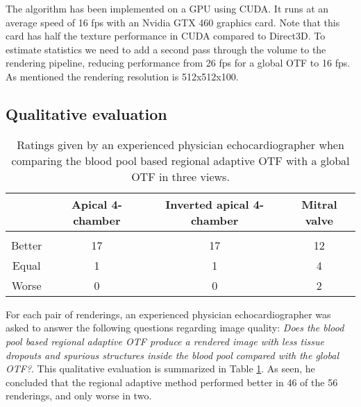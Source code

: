 The algorithm has been implemented on a GPU using CUDA. It runs at an average speed of 16 fps with an Nvidia GTX 460 graphics card. Note that this card has half the texture performance in CUDA compared to Direct3D. To estimate statistics we need to add a second pass through the volume to the rendering pipeline, reducing performance from 26 fps for a global OTF to 16 fps. As mentioned the rendering resolution is 512x512x100.

\subsection{Qualitative evaluation}
\begin{table}
\begin{center}
\begin{tabular}{c|ccc}
& Apical 4-chamber & Inverted apical 4-chamber & Mitral valve \\ \hline \\[-1.5ex]
Better & 17 & 17 &  12 \\ 
Equal  & 1 & 1 & 4\\
Worse & 0 & 0 & 2\\
\end{tabular}
\end{center}
\caption[]{\label{tab:stat2} Ratings given  by an experienced physician echocardiographer when comparing the blood pool based regional adaptive OTF with a global OTF in three views.}
\end{table}
For each pair of renderings, an experienced physician echocardiographer was asked to answer the following questions regarding image quality: \emph{Does the blood pool based regional adaptive OTF produce a rendered image with less tissue dropouts and spurious structures inside the blood pool compared with the global OTF?}. This qualitative evaluation is summarized in Table \ref{tab:stat2}. As seen, he concluded that the regional adaptive method performed better in 46 of the 56 renderings, and only worse in two.

